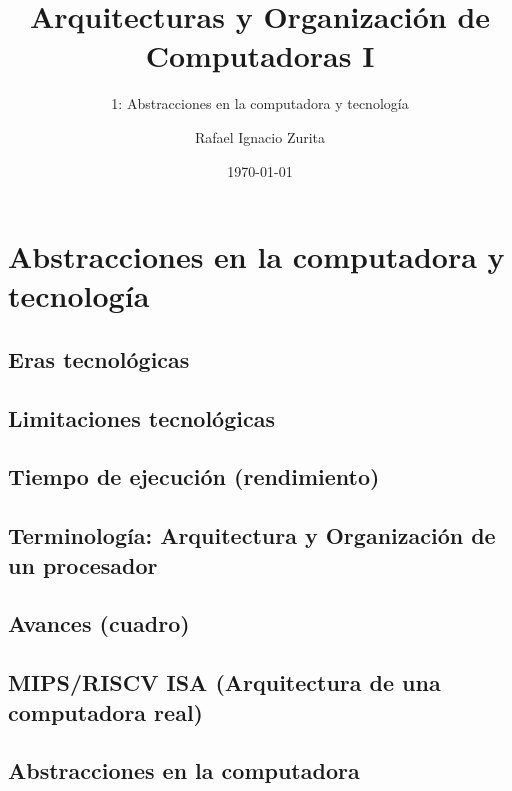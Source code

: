 \documentclass[aspectratio=169,compress]{beamer}
\title{Arquitecturas y Organización de Computadoras I}
\subtitle{1: Abstracciones en la computadora y tecnología}
\author{Rafael Ignacio Zurita}
\institute{Depto. Ingeniería de Computadoras}
\date{\today}
\begin{document}
\begin{frame}
\bigskip
  \maketitle
\end{frame}




\section{Abstracciones en la computadora y tecnología}

\subsection{Eras tecnológicas}
\subsection{Limitaciones tecnológicas}
\subsection{Tiempo de ejecución (rendimiento)}
\subsection{Terminología: Arquitectura y Organización de un procesador}
\subsection{Avances (cuadro)}
\subsection{MIPS/RISCV ISA (Arquitectura de una computadora real)}

\subsection{Abstracciones en la computadora}
\end{document}

